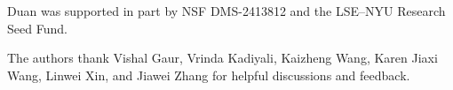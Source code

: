 \documentclass[mnsc,nonblindrev]{informs3_hide}
\begin{document}
    Duan was supported in part by NSF DMS-2413812 and the LSE--NYU Research Seed Fund.
    
    The authors thank Vishal Gaur, Vrinda Kadiyali, Kaizheng Wang, Karen Jiaxi Wang, Linwei Xin, and Jiawei Zhang for helpful discussions and feedback.






\clearpage

\OneAndAHalfSpacedXI

%
%
%
\end{document}

